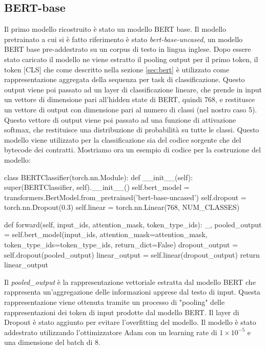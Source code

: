 \documentclass[../../Thesis.tex]{subfiles}
\begin{document}
\subsection{BERT-base}
Il primo modello ricostruito è stato un modello BERT base. Il modello pretrainato a cui si è fatto riferimento è stato \textit{bert-base-uncased}, un modello BERT base pre-addestrato su un corpus di testo in lingua inglese. Dopo essere stato caricato il modello ne viene estratto il pooling output per il primo token, il token [CLS] che come descritto nella sezione \ref{sec:bert} è utilizzato come rappresentazione aggregata della sequenza per task di classificazione. Questo output viene poi passato ad un layer di classificazione lineare, che prende in input un vettore di dimensione pari all'hidden state di BERT, quindi 768, e restitusce un vettore di output con dimensione pari al numero di classi (nel nostro caso 5). Questo vettore di output viene poi passato ad una funzione di attivazione softmax, che restituisce una distribuzione di probabilità su tutte le classi. Questo modello viene utilizzato per la classificazione sia del codice sorgente che del bytecode dei contratti. Mostriamo ora un esempio di codice per la costruzione del modello: 
\begin{python}
    class BERTClassifier(torch.nn.Module):
    def __init__(self):
        super(BERTClassifier, self).__init__()
        self.bert_model = transformers.BertModel.from_pretrained('bert-base-uncased')
        self.dropout = torch.nn.Dropout(0.3)
        self.linear = torch.nn.Linear(768, NUM_CLASSES)
    
    def forward(self, input_ids, attention_mask, token_type_ids):
        _, pooled_output = self.bert_model(input_ids, attention_mask=attention_mask, token_type_ids=token_type_ids, return_dict=False)
        dropout_output = self.dropout(pooled_output)
        linear_output = self.linear(dropout_output)
        return linear_output
\end{python}
Il \emph{pooled\_output} è la rappresentazione vettoriale estratta dal modello BERT che rappresenta un'aggregazione delle informazioni apprese dal testo di input. Questa rappresentazione viene ottenuta tramite un processo di "pooling" delle rappresentazioni dei token di input prodotte dal modello BERT.
Il layer di Dropout è stato aggiunto per evitare l'overfitting del modello. Il modello è stato addestrato utilizzando l'ottimizzatore Adam con un learning rate di $1 \times 10^{-5}$ e una dimensione del batch di 8.
\end{document}
